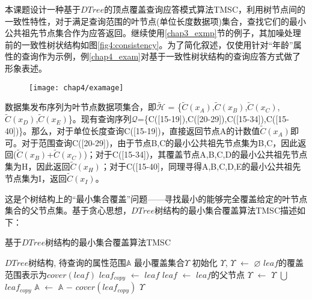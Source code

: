 本课题设计一种基于$DTree$的顶点覆盖查询应答模式算法TMSC，利用树节点间的一致性特性，对于满足查询范围的叶节点(单位长度数据项)集合，查找它们的最小公共祖先节点集合作为应答返回。继续使用\ref{chap3_exmp}节的例子，其加噪处理前的一致性树状结构如图\ref{fig4:consistency}。为了简化叙述，仅使用针对“年龄”属性的查询作为示例，例\ref{chap4_exam}对基于一致性树状结构的查询应答方式做了形象表述。

\begin{figure}[!htp]
	\centering
	\texttt{[image: chap4/examage]}
\end{figure}

\begin{exmp}
\label{chap4_exam}
数据集发布序列为叶节点数据项集合，即$\tilde{\mathcal{H}}$ = \{$\tilde{C}(x_{A})$,$\tilde{C}(x_{B})$,$\tilde{C}(x_{C})$,$\tilde{C}(x_{D})$,$\tilde{C}(x_{E})$\}。现有查询序列$\mathcal{Q}$=\{C([15-19]),C([20-29]),C([15-34]),C([15-40])\}。那么，对于单位长度查询C([15-19])，直接返回节点A的计数值$\tilde{C}(x_{A})$即可。对于范围查询C([20-29])，由于节点B,C的最小公共祖先节点集为{B,C}，因此返回($\tilde{C}(x_{B})$+$\tilde{C}(x_{C})$)；对于C([15-34])，其覆盖节点A,B,C,D的最小公共祖先节点集为{H}，因此返回$\tilde{C}(x_{H})$；对于C([15-40]，同理寻得A,B,C,D,E的最小公共祖先节点集为{I}，返回$\tilde{C}(x_{I})$。
\end{exmp}

这是个树结构上的“最小集合覆盖”问题——寻找最小的能够完全覆盖给定的叶节点集合的父节点集。基于贪心思想，$DTree$树结构的最小集合覆盖算法TMSC描述如下：

\begin{algorithm}[H]
	\caption{基于$DTree$树结构的最小集合覆盖算法TMSC}
	\label{msc}
	\begin{algorithmic}[1]
		\REQUIRE $DTree$树结构, 待查询的属性范围$\mathbb{A}$
		\ENSURE 最小覆盖集合$\Upsilon$
		初始化 $\Upsilon$, $\Upsilon$ $\leftarrow$ $\varnothing$
		\STATE $leaf$的覆盖范围表示为$cover(leaf)$
		\STATE $leaf_{copy}$ $\leftarrow$ $leaf$
		\STATE $leaf$ $\leftarrow$ $leaf$的父节点
		\ENDWHILE 
		\STATE $\Upsilon$ $\leftarrow$ $\Upsilon$ $\bigcup$ $leaf_{copy}$
		\STATE $\mathbb{A}$ $\leftarrow$ $\mathbb{A}$ $-$ $cover(leaf_{copy})$
		\RETURN $\Upsilon$
		\ENDIF
		\ENDFOR
	\end{algorithmic}
\end{algorithm}

